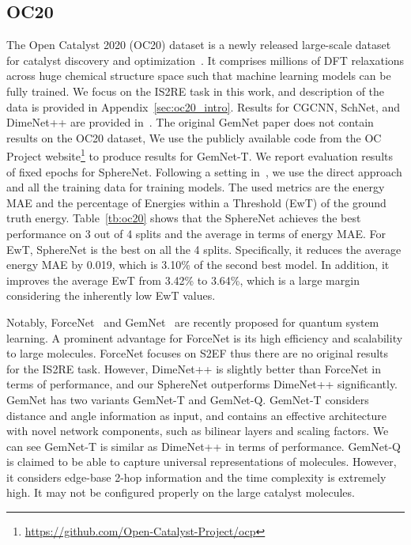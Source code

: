 \documentclass{article}
\begin{document}
\subsection{OC20}
The Open Catalyst 2020 (OC20) dataset is a newly released large-scale dataset for catalyst discovery and optimization~\citep{chanussot2020open}.
It comprises millions of DFT relaxations across huge
chemical structure space such that machine learning models can
be fully trained.
We focus on the IS2RE task in this work, and description
of the data is provided in Appendix~\ref{sec:oc20_intro}.
Results for CGCNN, SchNet, and DimeNet++ are provided in~\citet{chanussot2020open}.
The original GemNet paper does not contain results on the OC20 dataset,
We use the publicly available code from the OC Project website\footnote{\url{https://github.com/Open-Catalyst-Project/ocp}}
to produce results for GemNet-T.
We report evaluation results of fixed epochs for SphereNet.
Following a setting in~\citet{chanussot2020open}, we use the direct approach and all the training data for training models.
The used metrics are the energy MAE and 
the percentage of Energies within a Threshold (EwT) of the ground truth energy.
Table~\ref{tb:oc20} shows that the SphereNet achieves the best performance
on 3 out of 4 splits and the average in terms of energy MAE.
For EwT, SphereNet is the best on all the 4 splits.
Specifically, it reduces the average energy MAE by 0.019,
which is 3.10\% of the second best model.
In addition, it improves the average EwT from 3.42\% to 3.64\%,
which is a large margin considering the inherently low EwT values.

Notably, ForceNet~\citep{hu2021forcenet} and GemNet~\citep{klicpera2021gemnet} are recently proposed
for quantum system learning.
A prominent advantage for ForceNet is its high efficiency and scalability to large molecules.
ForceNet focuses on S2EF thus there are no original results for the IS2RE task.
However, DimeNet++ is slightly better than ForceNet in terms of performance,
and our SphereNet outperforms DimeNet++ significantly.
GemNet has two variants GemNet-T and GemNet-Q.
GemNet-T considers distance and angle information as input,
and contains an effective architecture
with novel network components, such as bilinear layers and scaling factors.
We can see GemNet-T is similar as DimeNet++ in terms of performance.
GemNet-Q is claimed to be able to capture universal
representations of molecules. However, it considers edge-base 2-hop information 
and the time complexity is 
extremely high. It may not be configured properly on the large
catalyst molecules.
\end{document}
